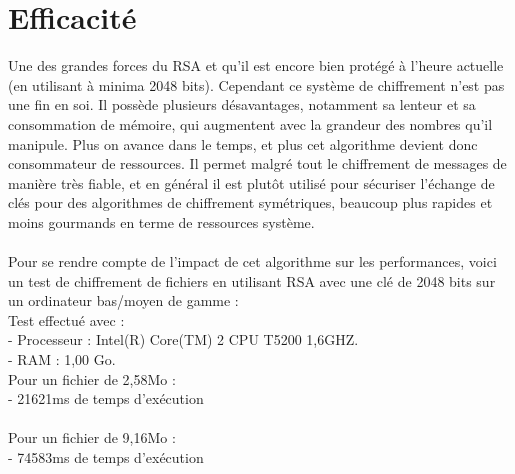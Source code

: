	\section{Efficacité}
		Une des grandes forces du RSA et qu'il est encore bien protégé à l'heure actuelle (en utilisant à minima 2048 bits). Cependant ce système de chiffrement n'est pas une fin en soi. Il possède plusieurs désavantages, notamment sa lenteur et sa consommation de mémoire, qui augmentent avec la grandeur des nombres qu'il manipule. Plus on avance dans le temps, et plus cet algorithme devient donc consommateur de ressources. Il permet malgré tout le chiffrement de messages de manière très fiable, et en général il est plutôt utilisé pour sécuriser l'échange de clés pour des algorithmes de chiffrement symétriques, beaucoup plus rapides et moins gourmands en terme de ressources système.\\
		\\
		Pour se rendre compte de l'impact de cet algorithme sur les performances, voici un test de chiffrement de fichiers en utilisant RSA avec une clé de 2048 bits sur un ordinateur bas/moyen de gamme :\\
			Test effectué avec :\\
			- Processeur : Intel(R) Core(TM) 2 CPU T5200 1,6GHZ.\\
			- RAM : 1,00 Go.\\
			
			Pour un fichier de 2,58Mo :\\
				- 21621ms de temps d'exécution\\\\ 
			Pour un fichier de 9,16Mo :\\
				- 74583ms de temps d'exécution\\
